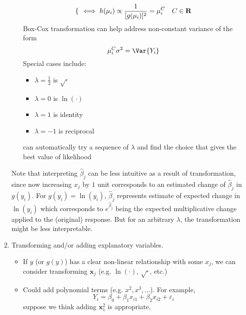 \begin{enumerate}[label=(\arabic*)]
\begin{enumerate}[label=(\roman*)]
\[\begin{dcases}
                              \end{dcases}\iff h(\mu_i)\propto \frac{1}{[g(\mu_i)]^2}
                              =\mu_i^C \quad {C\in\mathbf{R}}  \]
                        Box-Cox transformation can help address non-constant
                        variance of the form
                        \[ \mu_i^C\sigma^2=\Var{Y_i} \]
                        Special cases include:
                        \begin{itemize}
                              \item $ \displaystyle \lambda=\frac{1}{2} $ is $ \sqrt{\cdot} $
                              \item $ \lambda=0 $ is $ \ln(\cdot) $
                              \item $ \lambda=1 $ is identity
                              \item $ \lambda=-1 $ is reciprocal
                        \end{itemize}
                        can automatically try a sequence of $ \lambda $
                        and find the choice that gives the best value of
                        likelihood
            \end{enumerate}
            Note that interpreting $ \hat{\beta}_j $ can be less intuitive
            as a result of transformation, since now increasing $ x_j $
            by $ 1 $ unit corresponds to an estimated change of $ \hat{\beta}_j $
            in $ g(y_i) $. For $ g(y_i)=\ln(y_i) $, $ \hat{\beta}_j $
            represents estimate of expected change in $ \ln(y_i) $
            which corresponds to $ e^{\hat{\beta}_j} $ being
            the expected multiplicative change applied to the (original)
            response. But for an arbitrary $ \lambda $, the transformation
            might be less interpretable.
      \item Transforming and/or adding explanatory variables.
            \begin{itemize}
                  \item If $ y $ (or $ g(y) $) has a clear non-linear
                        relationship with some $ x_j $, we can consider transforming
                        $ \symbf{x}_j $ (e.g. $ \ln(\cdot) $, $ \sqrt{\cdot} $, etc.)
                  \item Could add polynomial terms (e.g. $ x^2,x^3,\ldots$). For example,
                        \[ Y_i=\beta_0+\beta_1x_{i1}+\beta_2x_{i2}+\varepsilon_i \]
                        suppose we think adding $ \symbf{x}_1^2 $ is appropriate,

\end{itemize}
\end{enumerate}
